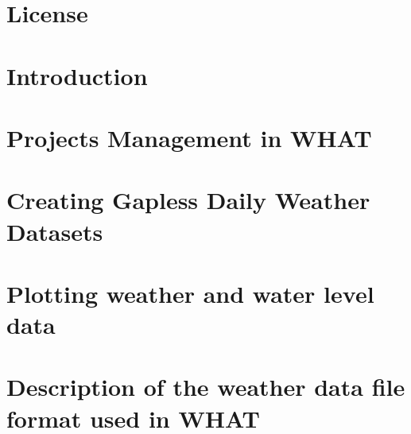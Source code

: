 \documentclass[12pt, letterpaper, fleqn]{report}
\begin{document}
%
\hypersetup{pageanchor=false}
\begin{titlepage}
    \centering
    
\end{titlepage}
\hypersetup{pageanchor=true}
%
\chapter*{License}
    
%    
\tableofcontents
\listoffigures
%
%
\chapter{Introduction}
    
%
\chapter{Projects Management in WHAT}\label{WHAT_projects}
    
\chapter{Creating Gapless Daily Weather Datasets}
    \label{chap:gapfilling}
    
    
\chapter{Plotting weather and water level data}\label{chap:plotting_data}
    




\appendix


\chapter{Description of the weather data file format used in WHAT}
    \label{sec:weather_datafile_format}
    
%

\end{document}

